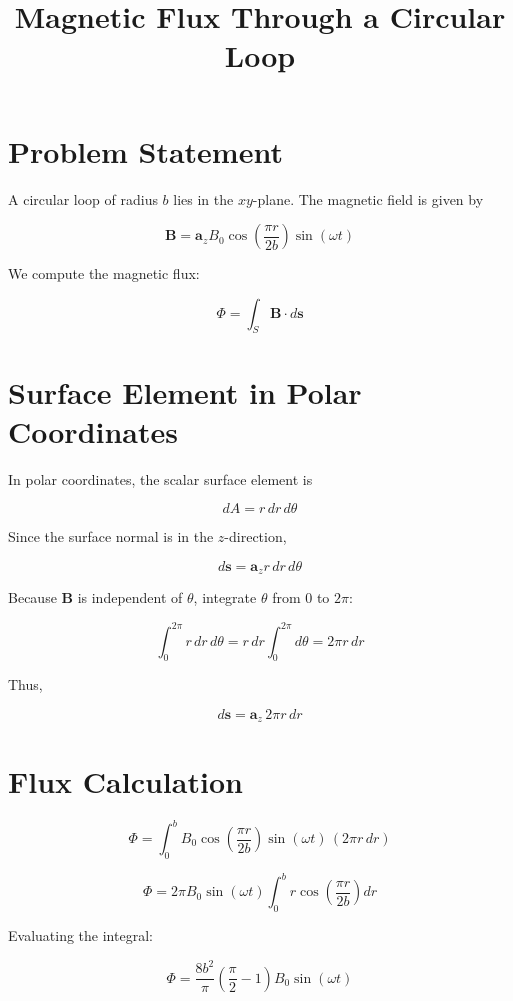 \documentclass[12pt, a4paper]{article}
\title{Magnetic Flux Through a Circular Loop}
\author{}
\date{}
\begin{document}
\maketitle

\section{Problem Statement}

A circular loop of radius $b$ lies in the $xy$-plane.  
The magnetic field is given by

\[
\mathbf{B} = \mathbf{a}_z B_0 
\cos\!\left(\frac{\pi r}{2b}\right)
\sin(\omega t)
\]

We compute the magnetic flux:

\[
\Phi = \int_S \mathbf{B} \cdot d\mathbf{s}
\]

\section{Surface Element in Polar Coordinates}

In polar coordinates, the scalar surface element is

\[
dA = r\,dr\,d\theta
\]

Since the surface normal is in the $z$-direction,

\[
d\mathbf{s} = \mathbf{a}_z r\,dr\,d\theta
\]

Because $\mathbf{B}$ is independent of $\theta$, integrate $\theta$ from $0$ to $2\pi$:

\[
\int_0^{2\pi} r\,dr\,d\theta
=
r\,dr \int_0^{2\pi} d\theta
=
2\pi r\,dr
\]

Thus,

\[
d\mathbf{s} = \mathbf{a}_z\,2\pi r\,dr
\]

\section{Flux Calculation}

\[
\Phi
=
\int_0^b
B_0 
\cos\!\left(\frac{\pi r}{2b}\right)
\sin(\omega t)
\,(2\pi r\,dr)
\]

\[
\Phi
=
2\pi B_0 \sin(\omega t)
\int_0^b
r \cos\!\left(\frac{\pi r}{2b}\right) dr
\]

Evaluating the integral:

\[
\Phi
=
\frac{8b^2}{\pi}
\left(
\frac{\pi}{2} - 1
\right)
B_0 \sin(\omega t)
\]
\end{document}
